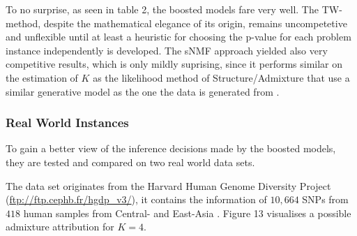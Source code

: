 \documentclass[a4paper, 11pt]{article}
\begin{document}
To no surprise, as seen in table 2, the boosted models fare very well. The TW-method, despite the mathematical elegance of its origin, remains uncompetetive and unflexible until at least a heuristic for choosing the p-value for each problem instance independently is developed. The sNMF approach yielded also very competitive results, which is only mildly suprising, since it performs similar on the estimation of $K$ as the likelihood method of Structure/Admixture that use a similar generative model as the one the data is generated from \parencite{frichot2014fast}.\\

\subsubsection{Real World Instances}
To gain a better view of the inference decisions made by the boosted models, they are tested and compared on two real world data sets.

The data set originates from the Harvard Human Genome Diversity Project (\url{ftp://ftp.cephb.fr/hgdp_v3/}), it contains the information of $10,664$ SNPs from $418$ human samples from Central- and East-Asia \parencite{frichot2012correcting}. Figure 13 visualises a possible admixture attribution for $K = 4$.\\
\end{document}
